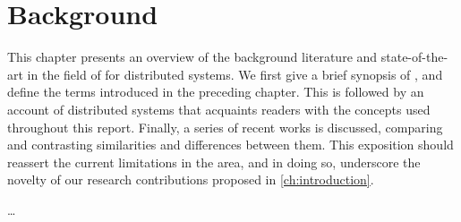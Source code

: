 \chapter{Background}\label{ch:background}

This chapter presents an overview of the background literature and state-of-the-art in the field of \RV for distributed systems. 
%
We first give a brief synopsis of \RV, and define the terms introduced in the preceding chapter.
%
This is followed by an account of distributed systems that acquaints readers with the concepts used throughout this report.
%
Finally, a series of recent works is discussed, comparing and contrasting similarities and differences between them.
%
This exposition should reassert the current limitations in the area, and in doing so, underscore the novelty of our research contributions proposed in \cref{ch:introduction}.

\ldots